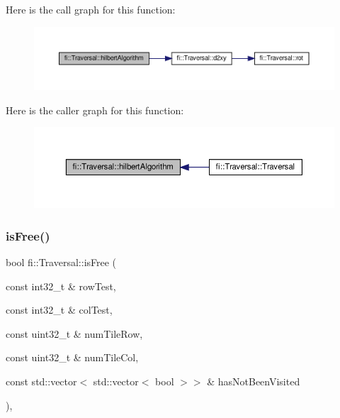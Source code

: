 Here is the call graph for this function\+:
\nopagebreak
\begin{figure}[H]
\begin{center}
\leavevmode
\includegraphics[width=350pt]{d8/d0e/classfi_1_1Traversal_a77545ba72aaf6831409ce8bcc399a7eb_cgraph}
\end{center}
\end{figure}
Here is the caller graph for this function\+:
\nopagebreak
\begin{figure}[H]
\begin{center}
\leavevmode
\includegraphics[width=350pt]{d8/d0e/classfi_1_1Traversal_a77545ba72aaf6831409ce8bcc399a7eb_icgraph}
\end{center}
\end{figure}
\mbox{\label{classfi_1_1Traversal_ac6002a1bd99614aefa265937a3fa989c}} 
\subsubsection{\texorpdfstring{is\+Free()}{isFree()}}
{\footnotesize\ttfamily bool fi\+::\+Traversal\+::is\+Free (\begin{DoxyParamCaption}\item[{const int32\+\_\+t \&}]{row\+Test,  }\item[{const int32\+\_\+t \&}]{col\+Test,  }\item[{const uint32\+\_\+t \&}]{num\+Tile\+Row,  }\item[{const uint32\+\_\+t \&}]{num\+Tile\+Col,  }\item[{const std\+::vector$<$ std\+::vector$<$ bool $>$$>$ \&}]{has\+Not\+Been\+Visited }\end{DoxyParamCaption})\hspace{0.3cm}{\ttfamily [inline]}, {\ttfamily [private]}}



